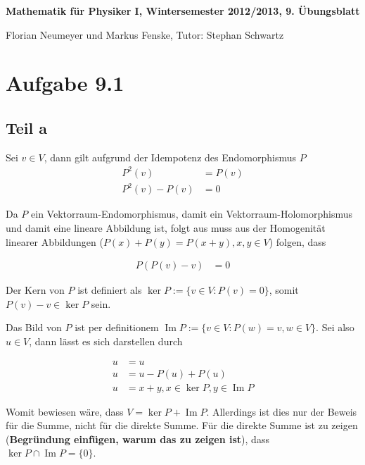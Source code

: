 \documentclass[a4paper,german,12pt,smallheadings]{scrartcl}
\begin{document}
\begin{center}
\bfseries %
\sffamily %
\vspace{-40pt}
Mathematik für Physiker I, Wintersemester 2012/2013, 9. Übungsblatt

Florian Neumeyer und Markus Fenske, Tutor: Stephan Schwartz
\vspace{-10pt}
\end{center}


\section*{Aufgabe 9.1}
\subsection*{Teil a}

Sei $v \in V$, dann gilt aufgrund der Idempotenz des Endomorphismus $P$
\begin{align*}
  P^2(v) &= P(v) \\
  P^2(v) - P(v) &= 0
\end{align*}

Da $P$ ein Vektorraum-Endomorphismus, damit ein Vektorraum-Holomorphismus und
damit eine lineare Abbildung ist, folgt aus muss aus der Homogenität linearer
Abbildungen ($P(x) + P(y) = P(x+y), x{,}y \in V$) folgen, dass

\begin{align*}
  P(P(v) - v) &= 0
\end{align*}

Der Kern von $P$ ist definiert als $\ker P := \{v \in V: P(v) = 0\}$, somit
$P(v) - v \in \ker P$ sein.

Das Bild von $P$ ist per definitionem $\operatorname{Im} P := \{v \in V: P(w) = v, w \in V\}$.
Sei also $u \in V$, dann lässt es sich darstellen durch

\begin{align*}
  u &= u \\
  u &= u - P(u) + P(u) \\
  u &= x + y, x \in \ker P, y \in \operatorname{Im} P
\end{align*}

Womit bewiesen wäre, dass $V = \ker P + \operatorname{Im} P$. Allerdings ist
dies nur der Beweis für die Summe, nicht für die direkte Summe. Für die direkte
Summe ist zu zeigen (\textbf{Begründung einfügen, warum das zu zeigen ist}),
dass $\ker P \cap \operatorname{Im} P = \{0\}$.
\end{document}
